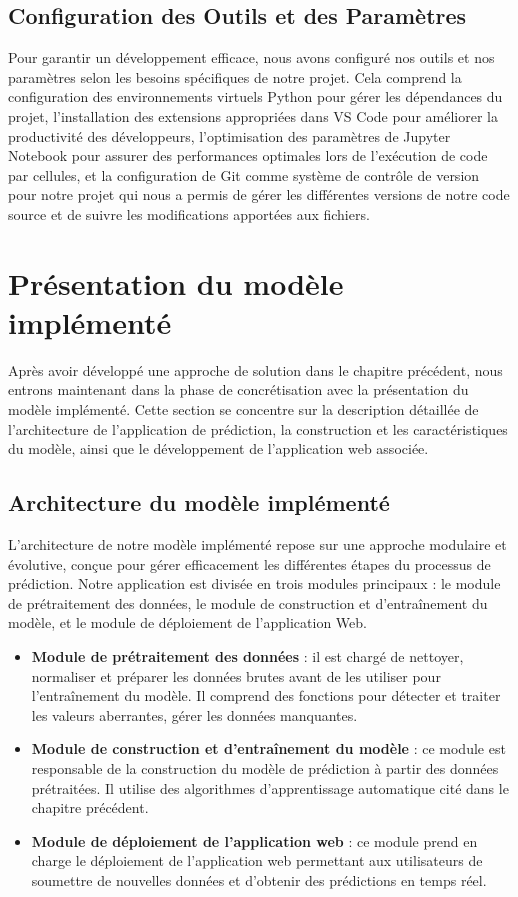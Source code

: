 \subsection{Configuration des Outils et des Paramètres}
Pour garantir un développement efficace, nous avons configuré nos outils et nos paramètres selon les besoins spécifiques de notre projet. Cela comprend la configuration des environnements virtuels Python pour gérer les dépendances du projet, l'installation des extensions appropriées dans VS Code pour améliorer la productivité des développeurs, l'optimisation des paramètres de Jupyter Notebook pour assurer des performances optimales lors de l'exécution de code par cellules, et la configuration de Git comme système de contrôle de version pour notre projet qui nous a permis de gérer les différentes versions de notre code source et de suivre les modifications apportées aux fichiers.

\section{Présentation du modèle implémenté}
Après avoir développé une approche de solution dans le chapitre précédent, nous entrons maintenant dans la phase de concrétisation avec la présentation du modèle implémenté. Cette section se concentre sur la description détaillée de l'architecture de l'application de prédiction, la construction et les caractéristiques du modèle, ainsi que le développement de l'application web associée.

\subsection{Architecture du modèle implémenté}
L'architecture de notre modèle implémenté repose sur une approche modulaire et évolutive, conçue pour gérer efficacement les différentes étapes du processus de prédiction. Notre application est divisée en trois modules principaux : le module de prétraitement des données, le module de construction et d'entraînement du modèle, et le module de déploiement de l'application Web. 
\begin{itemize} 
	\item[\ding{118}] \textbf{Module de prétraitement des données} : il est chargé de nettoyer, normaliser et préparer les données brutes avant de les utiliser pour l'entraînement du modèle. Il comprend des fonctions pour détecter et traiter les valeurs aberrantes, gérer les données manquantes. 
	\item[\ding{118}] \textbf{Module de construction et d'entraînement du modèle} : ce module est responsable de la construction du modèle de prédiction à partir des données prétraitées. Il utilise des algorithmes d'apprentissage automatique cité dans le chapitre précédent. 
	\item[\ding{118}] \textbf{Module de déploiement de l'application web} : ce module prend en charge le déploiement de l'application web permettant aux utilisateurs de soumettre de nouvelles données et d'obtenir des prédictions en temps réel. 
\end{itemize}

